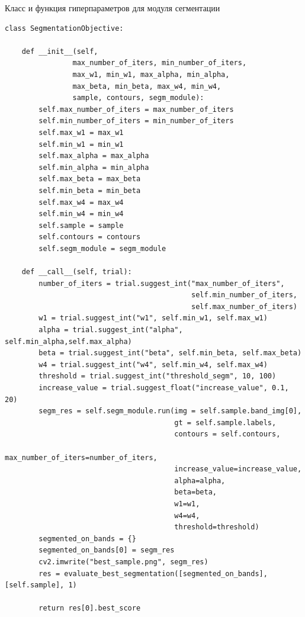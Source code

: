 \documentclass[14pt, russian]{scrartcl}
\begin{document}
\begin{listing}[!htt]
    \caption{Класс и функция гиперпараметров для модуля сегментации}
    \label{lst:contour_extr_sobel}
    \begin{verbatim}
class SegmentationObjective:

    def __init__(self,
                max_number_of_iters, min_number_of_iters,
                max_w1, min_w1, max_alpha, min_alpha,
                max_beta, min_beta, max_w4, min_w4,
                sample, contours, segm_module):
        self.max_number_of_iters = max_number_of_iters
        self.min_number_of_iters = min_number_of_iters
        self.max_w1 = max_w1
        self.min_w1 = min_w1
        self.max_alpha = max_alpha
        self.min_alpha = min_alpha
        self.max_beta = max_beta
        self.min_beta = min_beta
        self.max_w4 = max_w4
        self.min_w4 = min_w4
        self.sample = sample
        self.contours = contours
        self.segm_module = segm_module

    def __call__(self, trial):
        number_of_iters = trial.suggest_int("max_number_of_iters", 
                                            self.min_number_of_iters, 
                                            self.max_number_of_iters)
        w1 = trial.suggest_int("w1", self.min_w1, self.max_w1)
        alpha = trial.suggest_int("alpha", self.min_alpha,self.max_alpha)
        beta = trial.suggest_int("beta", self.min_beta, self.max_beta)
        w4 = trial.suggest_int("w4", self.min_w4, self.max_w4)
        threshold = trial.suggest_int("threshold_segm", 10, 100)
        increase_value = trial.suggest_float("increase_value", 0.1, 20)
        segm_res = self.segm_module.run(img = self.sample.band_img[0],
                                        gt = self.sample.labels,
                                        contours = self.contours,
                                        max_number_of_iters=number_of_iters,
                                        increase_value=increase_value,
                                        alpha=alpha,
                                        beta=beta,
                                        w1=w1,
                                        w4=w4,
                                        threshold=threshold)
        segmented_on_bands = {}
        segmented_on_bands[0] = segm_res
        cv2.imwrite("best_sample.png", segm_res)
        res = evaluate_best_segmentation([segmented_on_bands], [self.sample], 1)

        return res[0].best_score
    \end{verbatim}
\end{listing}
\end{document}
